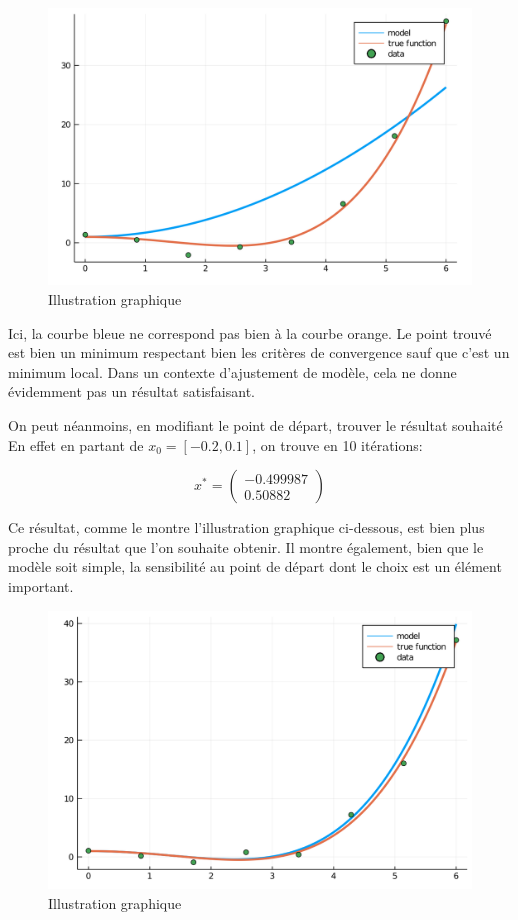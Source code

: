 \documentclass[a4paper,11pt]{article}
\numberwithin{equation}{section}
\begin{document}
\begin{figure}[!h]
\centering
\includegraphics[scale=0.6]{images/courbe2}
\caption{Illustration graphique}
\end{figure}

Ici, la courbe bleue ne correspond pas bien à la courbe orange. Le point trouvé est bien un minimum respectant bien les critères de convergence sauf que c'est un minimum local. Dans un contexte d'ajustement de modèle, cela ne donne évidemment pas un résultat satisfaisant.

On peut néanmoins, en modifiant le point de départ, trouver le résultat souhaité
En effet en partant de $x_{0} = [-0.2,0.1]$, on trouve en 10 itérations:

$$
 x^{*} = \begin{pmatrix}
-0.499987\\
0.50882
\end{pmatrix}$$

Ce résultat, comme le montre l'illustration graphique ci-dessous, est bien plus proche du résultat que l'on souhaite obtenir. Il montre également, bien que le modèle soit simple, la sensibilité au point de départ dont le choix est un élément important.
\begin{figure}[!h]
\centering
\includegraphics[scale=0.6]{images/courbe3}
\caption{Illustration graphique}
\end{figure}




\end{document}

